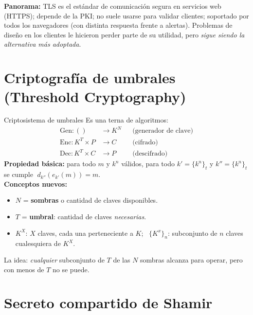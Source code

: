 \documentclass[11pt,a4paper]{article}
\begin{document}
\begin{slidebox}
\textbf{Panorama:} TLS es el estándar de comunicación segura en servicios web (HTTPS); depende
de la PKI; no suele usarse para validar clientes; soportado por todos los navegadores (con
distinta respuesta frente a alertas). Problemas de diseño en los clientes le hicieron perder
parte de su utilidad, pero \emph{sigue siendo la alternativa más adoptada}.
\end{slidebox}

\section{Criptografía de umbrales (Threshold Cryptography)}

\begin{defbox}{Criptosistema de umbrales}
Es una terna de algoritmos:
\[
\begin{aligned}
  \text{Gen}: ()&\to K^N &&\text{(generador de clave)}\\
  \text{Enc}: K^T \times P &\to C &&\text{(cifrado)}\\
  \text{Dec}: K^T \times C &\to P &&\text{(descifrado)}
\end{aligned}
\]
\textbf{Propiedad básica:} para todo $m$ y $k^n$ válidos, para todo
$k' = \{k^n\}_t$ y $k'' = \{k^n\}_t$ se cumple $\;d_{k''}(e_{k'}(m)) = m$.\\[4pt]
\textbf{Conceptos nuevos:}
\begin{itemize}[leftmargin=1.4em,itemsep=0pt]
  \item $N$ = \textbf{sombras} o cantidad de claves disponibles.
  \item $T$ = \textbf{umbral}: cantidad de claves \emph{necesarias}.
  \item $K^X$: $X$ claves, cada una perteneciente a $K$; \ $\{K^x\}_n$: subconjunto de $n$
        claves cualesquiera de $K^X$.
\end{itemize}
\end{defbox}

La idea: \emph{cualquier} subconjunto de $T$ de las $N$ sombras alcanza para operar, pero con
menos de $T$ no se puede.

\section{Secreto compartido de Shamir}
\end{document}
